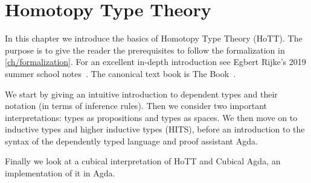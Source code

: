\chapter{Homotopy Type Theory}

In this chapter we introduce the basics of Homotopy Type Theory (HoTT). The
purpose is to give the reader the prerequisites to follow the formalization in
\autoref{ch/formalization}. For an excellent in-depth introduction
see Egbert Rijke's 2019 summer school notes~\cite{Rijke2019}. The canonical text
book is The Book~\cite{hottbook}.

We start by giving an intuitive introduction to dependent types and their
notation (in terms of inference rules). Then we consider two important
interpretations: types as propositions and types as spaces. We then move on to
inductive types and higher inductive types (HITS), before an introduction to the
syntax of the dependently typed language and proof assistant Agda.

Finally we look at a cubical interpretation of HoTT and Cubical Agda, an
implementation of it in Agda.